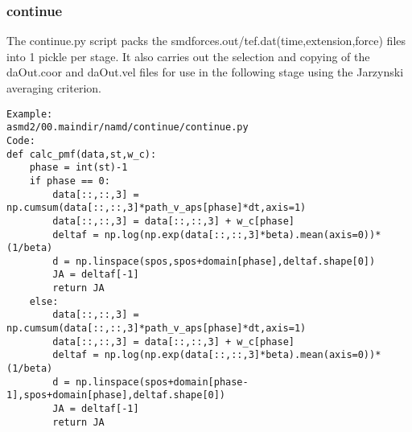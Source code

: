 \documentclass[11pt]{article}
\begin{document}
\subsubsection{continue}
The continue.py script packs the smdforces.out/tef.dat(time,extension,force) files into 1 pickle per stage. It also carries out the selection and copying of the daOut.coor and daOut.vel files for use in the following stage using the Jarzynski averaging criterion.
\begin{verbatim}
Example:
asmd2/00.maindir/namd/continue/continue.py
Code:
def calc_pmf(data,st,w_c):
    phase = int(st)-1
    if phase == 0:
        data[::,::,3] = np.cumsum(data[::,::,3]*path_v_aps[phase]*dt,axis=1)
        data[::,::,3] = data[::,::,3] + w_c[phase]
        deltaf = np.log(np.exp(data[::,::,3]*beta).mean(axis=0))*(1/beta)
        d = np.linspace(spos,spos+domain[phase],deltaf.shape[0])
        JA = deltaf[-1]
        return JA
    else:
        data[::,::,3] = np.cumsum(data[::,::,3]*path_v_aps[phase]*dt,axis=1)
        data[::,::,3] = data[::,::,3] + w_c[phase]
        deltaf = np.log(np.exp(data[::,::,3]*beta).mean(axis=0))*(1/beta)
        d = np.linspace(spos+domain[phase-1],spos+domain[phase],deltaf.shape[0])
        JA = deltaf[-1]
        return JA


\end{verbatim}
\end{document}
